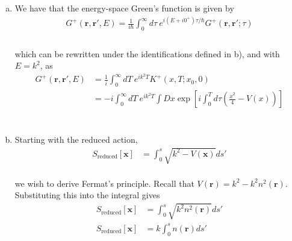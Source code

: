 \documentclass[]{article}
\begin{document}
\begin{enumerate}[1)]
\begin{enumerate}[a)]
\item We have that the energy-space Green's function is given by \\

\begin{equation}
\begin{aligned}
G^+ (\bm{r}, \bm{r}', E) = \frac{1 }{ i \hbar } \int_{0}^{\infty} d\tau \: e^{ i (E + i0^+) \tau /\hbar } G^+ (\bm{r}, \bm{r}' ; \tau ) \\
\end{aligned}
\end{equation} \\

which can be rewritten under the identifications defined in b), and with $E = k^2$, as \\

\begin{equation}
\begin{aligned}
G^+ (\bm{r}, \bm{r}', E) & = \frac{1 }{ i } \int_{0}^{\infty} dT \: e^{ i k^2 T } K^+( x, T ; x_0 , 0 )  \\
& = - i  \int_{0}^{\infty} dT \: e^{ i k^2 T }   \int Dx \exp\left[ i \int_{0}^{T} d\tau \left( \frac{   \dot{x}^2 }{4}   - V(x)   \right) \right] \\
\end{aligned}
\end{equation} \\


\item Starting with the reduced action, \\

\begin{equation}
\begin{aligned}
S_\text{reduced} \left[ \bm{x} \right] & = \int_{0}^{s} \sqrt{ k^2 - V(\bm{x})    } ds'
\end{aligned}
\end{equation} \\

we wish to derive Fermat's principle. Recall that $V(\bm{r})  = k^2 - k^2 n^2(\bm{r} ) $. Substituting this into the integral gives \\

\begin{equation}
\begin{aligned}
S_\text{reduced} \left[ \bm{x} \right] & = \int_{0}^{s} \sqrt{ k^2  n^2(\bm{r} )   } ds' \\
%
S_\text{reduced} \left[ \bm{x} \right] & = k \int_{0}^{s}   n(\bm{r} )  ds' \\
%
\end{aligned}
\end{equation} \\


\end{enumerate}
\end{enumerate}
\end{document}
